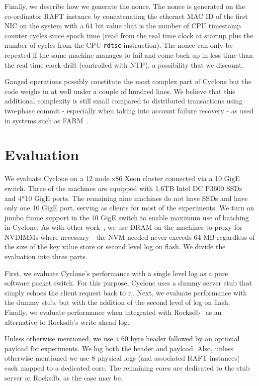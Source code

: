 \documentclass[twocolumn]{article}
\begin{document}
Finally, we describe how we generate the nonce. The nonce is generated on the
co-ordinator RAFT instance by concatenating the ethernet MAC ID of the first NIC
on the system with a 64 bit value that is the number of CPU timestamp counter
cycles since epoch time (read from the real time clock at startup plus the
number of cycles from the CPU {\tt rdtsc} instruction). The nonce can only be
repeated if the same machine manages to fail and come back up in less time than
the real time clock drift (controlled with NTP), a possibility that we discount.

Ganged operations possibly constitute the most complex part of Cyclone but the
code weighs in at well under a couple of hundred lines. We believe that
this additional complexity is still small compared to distributed transactions
using two-phase commit - especially when taking into account failure recovery -
as used in systems such as FARM~\cite{farm}.

\section{Evaluation}
\label{sec:evaluation}
We evaluate Cyclone on a 12 node x86 Xeon cluster connected via a 10 GigE
switch. Three of the machines are equipped with 1.6TB Intel DC P3600 SSDs and
4*10 GigE ports. The remaining nine machines do not have SSDs and have only one
10 GigE port, serving as clients for most of the experiments. We turn on jumbo
frame support in the 10 GigE switch to enable maximum use of batching in
Cyclone. As with other work~\cite{faast}, we use DRAM on the machines to proxy
for NVDIMMs where necessary - the NVM needed never exceeds 64 MB
regardless of the size of the key value store or second level log on flash. We
divide the evaluation into three parts.

First, we evaluate Cyclone's performance with a single level log as a pure
software packet switch. For this purpose, Cyclone uses a dummy server stub that
simply echoes the client request back to it. Next, we evaluate
performance with the dummy stub, but with the addition of the second level of log
on flash. Finally, we evaluate performance when integrated with
Rocksdb~\cite{rocksdb} as an alternative to Rocksdb's write ahead log.

Unless otherwise mentioned, we use a 60 byte header followed by an optional
payload for experiments. We log both the header and payload. Also, unless
otherwise mentioned we use 8 physical logs (and associated RAFT instances) each
mapped to a dedicated core. The remaining cores are dedicated to the stub
server or Rocksdb, as the case may be.
\end{document}
